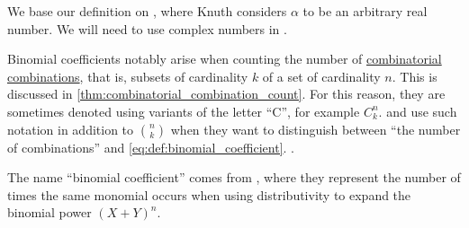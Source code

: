 \begin{comments}
  \item We base our definition on \cite[53]{Knuth1997ArtVol1}, where Knuth considers \( \alpha \) to be an arbitrary real number. We will need to use complex numbers in .

  \item Binomial coefficients notably arise when counting the number of \hyperref[def:combinatorial_combination]{combinatorial combinations}, that is, subsets of cardinality \( k \) of a set of cardinality \( n \). This is discussed in \cref{thm:combinatorial_combination_count}. For this reason, they are sometimes denoted using variants of the letter \enquote{C}, for example \( C_k^n \). \Textcite[432]{Rosen2019DiscreteMathematics} and \textcite[100]{БелоусовТкачёв2004ДискретнаяМатематика} use such notation in addition to \( \binom n k \) when they want to distinguish between \enquote{the number of combinations} and \eqref{eq:def:binomial_coefficient}.
  .

  \item The name \enquote{binomial coefficient} comes from , where they represent the number of times the same monomial occurs when using distributivity to expand the binomial power \( (X + Y)^n \).
\end{comments}

